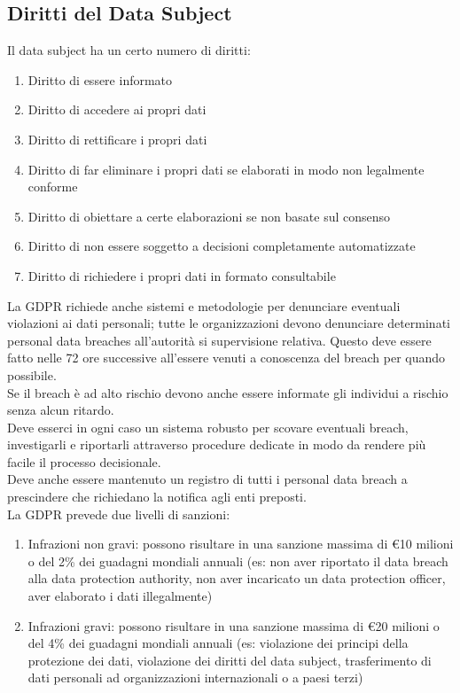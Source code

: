 \subsection{Diritti del Data Subject}
Il data subject ha un certo numero di diritti:
\begin{enumerate}[noitemsep]
    \item Diritto di essere informato
    \item Diritto di accedere ai propri dati
    \item Diritto di rettificare i propri dati
    \item Diritto di far eliminare i propri dati se elaborati in modo non legalmente conforme
    \item Diritto di obiettare a certe elaborazioni se non basate sul consenso
    \item Diritto di non essere soggetto a decisioni completamente automatizzate
    \item Diritto di richiedere i propri dati in formato consultabile
\end{enumerate}
La \acrshort{GDPR} richiede anche sistemi e metodologie per denunciare eventuali violazioni ai dati personali; tutte le organizzazioni devono denunciare determinati personal data breaches all'autorità si supervisione relativa.
Questo deve essere fatto nelle 72 ore successive all'essere venuti a conoscenza del breach per quando possibile.\\
Se il breach è ad alto rischio devono anche essere informate gli individui a rischio senza alcun ritardo.\\
Deve esserci in ogni caso un sistema robusto per scovare eventuali breach, investigarli e riportarli attraverso procedure dedicate in modo da rendere più facile il processo decisionale.\\
Deve anche essere mantenuto un registro di tutti i personal data breach a prescindere che richiedano la notifica agli enti preposti.\\

La \acrshort{GDPR} prevede due livelli di sanzioni:
\begin{enumerate}[noitemsep]
    \item Infrazioni non gravi: possono risultare in una sanzione massima di \euro 10 milioni o del 2\% dei guadagni mondiali annuali (es: non aver riportato il data breach alla data protection authority, non aver incaricato un data protection officer, aver elaborato i dati illegalmente)
    \item Infrazioni gravi: possono risultare in una sanzione massima di \euro 20 milioni o del 4\% dei guadagni mondiali annuali (es: violazione dei principi della protezione dei dati, violazione dei diritti del data subject, trasferimento di dati personali ad organizzazioni internazionali o a paesi terzi)
\end{enumerate}